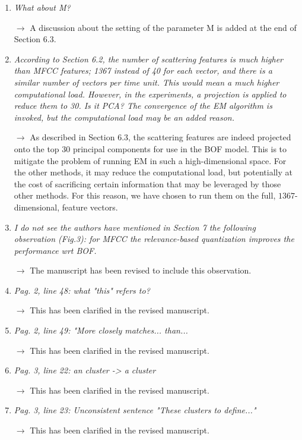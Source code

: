 \documentclass[10pt]{article}
\begin{document}
\begin{enumerate}
\item \emph{What about M?}

$\rightarrow$ A discussion about the setting of the parameter M is added at the end of Section 6.3.

\item \emph{According to Section 6.2, the number of scattering features is much higher than MFCC features; 1367 instead of 40 for each vector, and there is a similar number of vectors per time unit. This would mean a much higher computational load. However, in the experiments, a projection is applied to reduce them to 30. Is it PCA? The convergence of the EM  algorithm is invoked, but the computational load may be an added reason.}

$\rightarrow$
As described in Section 6.3, the scattering features are indeed projected onto the top $30$ principal components for use in the BOF model. This is to mitigate the problem of running EM in such a high-dimensional space. For the other methods, it may reduce the computational load, but potentially at the cost of sacrificing certain information that may be leveraged by those other methods. For this reason, we have chosen to run them on the full, $1367$-dimensional, feature vectors.

\item \emph{I do not see the authors have mentioned in Section 7 the following observation (Fig.3): for MFCC the relevance-based quantization improves the performance wrt BOF.}

$\rightarrow$
The manuscript has been revised to include this observation.

\item \emph{Pag. 2, line 48: what "this" refers to?}

$\rightarrow$
This has been clarified in the revised manuscript.

\item \emph{Pag. 2, line 49: "More closely matches... than...}

$\rightarrow$
This has been clarified in the revised manuscript.

\item \emph{Pag. 3, line 22: an cluster -\textgreater{} a cluster}

$\rightarrow$
This has been clarified in the revised manuscript.

\item \emph{Pag. 3, line 23: Unconsistent sentence "These clusters to define..."}

$\rightarrow$
This has been clarified in the revised manuscript.


\end{enumerate}
\end{document}

